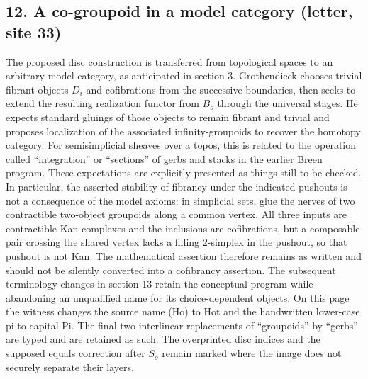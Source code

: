 \subsection*{12. A co-groupoid in a model category (letter, site 33)}
The proposed disc construction is transferred from topological spaces to an arbitrary model category, as anticipated in section 3. Grothendieck chooses trivial fibrant objects $D_i$ and cofibrations from the successive boundaries, then seeks to extend the resulting realization functor from $B_o$ through the universal stages. He expects standard gluings of those objects to remain fibrant and trivial and proposes localization of the associated infinity-groupoids to recover the homotopy category. For semisimplicial sheaves over a topos, this is related to the operation called ``integration'' or ``sections'' of gerbs and stacks in the earlier Breen program. These expectations are explicitly presented as things still to be checked. In particular, the asserted stability of fibrancy under the indicated pushouts is not a consequence of the model axioms: in simplicial sets, glue the nerves of two contractible two-object groupoids along a common vertex. All three inputs are contractible Kan complexes and the inclusions are cofibrations, but a composable pair crossing the shared vertex lacks a filling 2-simplex in the pushout, so that pushout is not Kan. The mathematical assertion therefore remains as written and should not be silently converted into a cofibrancy assertion. The subsequent terminology changes in section 13 retain the conceptual program while abandoning an unqualified name for its choice-dependent objects. On this page the witness changes the source name (Ho) to Hot and the handwritten lower-case pi to capital Pi. The final two interlinear replacements of ``groupoids'' by ``gerbs'' are typed and are retained as such. The overprinted disc indices and the supposed equals correction after $S_o$ remain marked where the image does not securely separate their layers.

